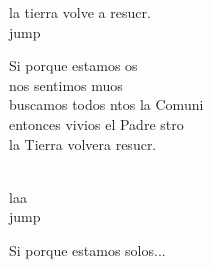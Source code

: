 \begin{cancion}
	la tierra volve a resucr.\\jump\\
	\begin{chorus}%
	Si porque estamos os \\
	nos sentimos muos\\
	buscamos todos ntos la Comuni\\
	entonces vivios el Padre stro\\
	la Tierra volvera resucr.\\
	\end{chorus}%
	\jump\\
	laa    \\jump\\
	\begin{chorus}%
Si porque estamos solos...\\
	\end{chorus}%
	\jump\\
\end{cancion}%
